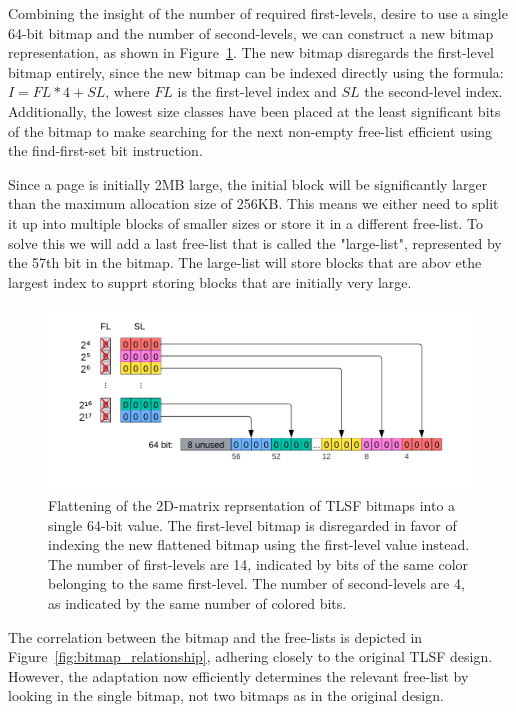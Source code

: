 Combining the insight of the number of required first-levels, desire to use a single 64-bit bitmap and the number of second-levels, we can construct a new bitmap representation, as shown in Figure~\ref{fig:bitmap_flattening}. The new bitmap disregards the first-level bitmap entirely, since the new bitmap can be indexed directly using the formula: $I = FL * 4 + SL$, where $FL$ is the first-level index and $SL$ the second-level index. Additionally, the lowest size classes have been placed at the least significant bits of the bitmap to make searching for the next non-empty free-list efficient using the find-first-set bit instruction.

Since a page is initially 2MB large, the initial block will be significantly larger than the maximum allocation size of 256KB. This means we either need to split it up into multiple blocks of smaller sizes or store it in a different free-list. To solve this we will add a last free-list that is called the "large-list", represented by the 57th bit in the bitmap. The large-list will store blocks that are abov ethe largest index to supprt storing blocks that are initially very large.

\begin{figure}[H]
    \centering
    \includegraphics[width=1\textwidth]{figures/bitmap_flattening.png}
    \caption{Flattening of the 2D-matrix reprsentation of TLSF bitmaps into a single 64-bit value. The first-level bitmap is disregarded in favor of indexing the new flattened bitmap using the first-level value instead. The number of first-levels are 14, indicated by bits of the same color belonging to the same first-level. The number of second-levels are 4, as indicated by the same number of colored bits.}
    \label{fig:bitmap_flattening}
\end{figure}

The correlation between the bitmap and the free-lists is depicted in Figure~\ref{fig:bitmap_relationship}, adhering closely to the original TLSF design. However, the adaptation now efficiently determines the relevant free-list by looking in the single bitmap, not two bitmaps as in the original design.

